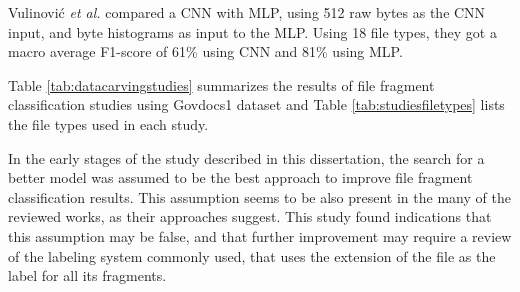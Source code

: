 Vulinović \textit{et al.} \cite{vulinovic_neural_2019}
compared a CNN with MLP, using 512 raw bytes as the CNN input, and byte histograms as input to the MLP.
Using 18 file types, they got a macro average F1-score of 61\% using CNN and 81\% using MLP.

Table \ref{tab:datacarvingstudies} summarizes 
the results of file fragment classification studies using Govdocs1 dataset and Table \ref{tab:studiesfiletypes}
lists the file types used in each study.






In the early stages of the study described in this dissertation, the search for a better model was assumed to be the best approach to improve file fragment classification results. This assumption seems to be also present in the many of the reviewed works, as their approaches suggest. This study found indications that this assumption may be false, and that further improvement may require a review of the labeling system commonly used, that uses the extension of the file as the label for all its fragments.
